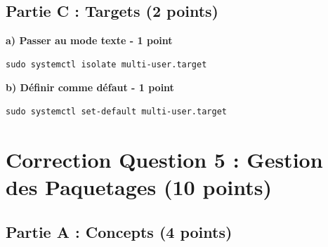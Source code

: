 \documentclass[12pt,a4paper]{article}
\begin{document}
\subsection*{Partie C : Targets (2 points)}

\begin{answerbox}
\textbf{a) Passer au mode texte - 1 point}
\begin{lstlisting}
sudo systemctl isolate multi-user.target
\end{lstlisting}

\textbf{b) Définir comme défaut - 1 point}
\begin{lstlisting}
sudo systemctl set-default multi-user.target
\end{lstlisting}
\end{answerbox}

\newpage


\section{Correction Question 5 : Gestion des Paquetages (10 points)}

\subsection*{Partie A : Concepts (4 points)}
\end{document}
